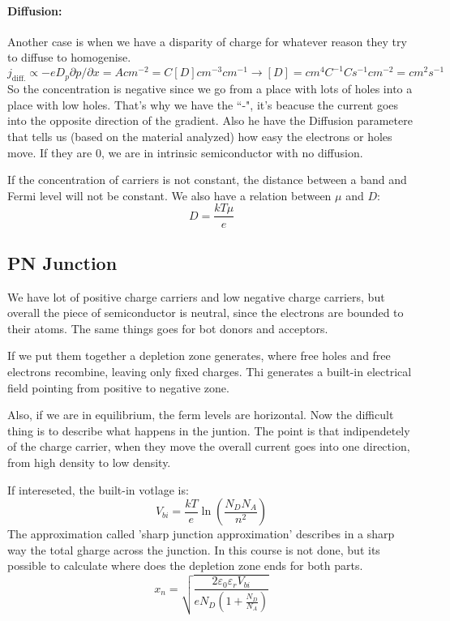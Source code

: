 \paragraph{Diffusion:} Another case is when we have a disparity of charge for whatever reason they try to diffuse to homogenise.
\begin{equation}
    j_{\text{diff.}} \propto -e D_p \partial p / \partial x = Acm^{-2} = C[D]cm^{-3}cm^{-1} \rightarrow [D] = cm^4C^{-1}Cs^{-1}cm^{-2} = cm^2s^{-1}
\end{equation}
So the concentration is negative since we go from a place with lots of holes into a place with low holes. That's why we have the  ``-", it's beacuse the current goes into the opposite direction of the gradient. Also he have the Diffusion parametere that tells us (based on the material analyzed) how easy the electrons or holes move.
If they are 0, we are in intrinsic semiconductor with no diffusion.

If the concentration of carriers is not constant, the distance between a band and Fermi level will not be constant. We also have a relation between $\mu$ and $D$:
\begin{equation}
    D = \frac{kT\mu}{e}
\end{equation} 

\subsection{PN Junction}
We have lot of positive charge carriers and low negative charge carriers, but overall the piece of semiconductor is neutral, since the electrons are bounded to their atoms. The same things goes for bot donors and acceptors.

If we put them together a depletion zone generates, where free holes and free electrons recombine, leaving only fixed charges. Thi generates a built-in electrical field pointing from positive to negative zone.

Also, if we are in equilibrium, the ferm levels are horizontal. Now the difficult thing is to describe what happens in the juntion. The point is that indipendetely of the charge carrier, when they move the overall current goes into one direction, from high density to low density.

If intereseted, the built-in votlage is:
\begin{equation}
    V_{bi} = \frac{kT}{e} \ln\left(\frac{N_DN_A}{n^2}\right)
\end{equation}
The approximation called 'sharp junction approximation' describes in a sharp way the total gharge across the junction. In this course is not done, but its possible to calculate where does the depletion zone ends for both parts.
\begin{equation}
    x_n = \sqrt{\frac{2\varepsilon_0\varepsilon_r V_{bi}}{eN_D\left(1+\frac{N_D}{N_A}\right)}}
\end{equation}